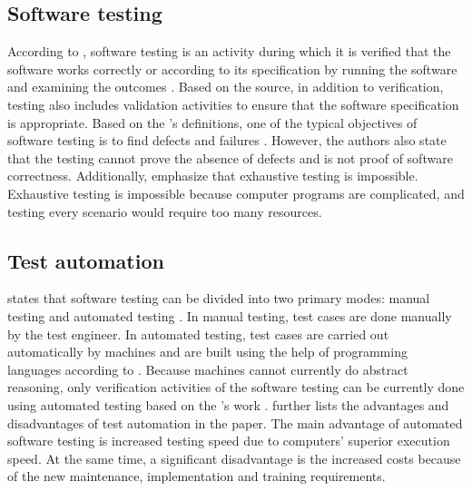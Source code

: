 \subsection{Software testing}\label{subsection:software_testing}
According to \citeauthor{ammann2016introduction}, software testing is an activity during which it is verified that the software works correctly or according to its specification by running the software and examining the outcomes \cite{ammann2016introduction}. Based on the source, in addition to verification, testing also includes validation activities to ensure that the software specification is appropriate. Based on the \citeauthor{olsen2018istqbFoundation}'s definitions, one of the typical objectives of software testing is to find defects and failures \cite{olsen2018istqbFoundation}. However, the authors also state that the testing cannot prove the absence of defects and is not proof of software correctness. Additionally, \citeauthor{olsen2018istqbFoundation} emphasize that exhaustive testing is impossible. Exhaustive testing is impossible because computer programs are complicated, and testing every scenario would require too many resources.

\subsection{Test automation}
\citeauthor{sharma2014quantitative} states that software testing can be divided into two primary modes: manual testing and automated testing \cite{sharma2014quantitative}. In manual testing, test cases are done manually by the test engineer. In automated testing, test cases are carried out automatically by machines and are built using the help of programming languages according to \citeauthor{sharma2014quantitative}. Because machines cannot currently do abstract reasoning, only verification activities of the software testing can be currently done using automated testing based on the \citeauthor{karhu2009empirical}'s work \cite{karhu2009empirical}. \citeauthor{karhu2009empirical} further lists the advantages and disadvantages of test automation in the paper. The main advantage of automated software testing is increased testing speed due to computers' superior execution speed. At the same time, a significant disadvantage is the increased costs because of the new maintenance, implementation and training requirements.

